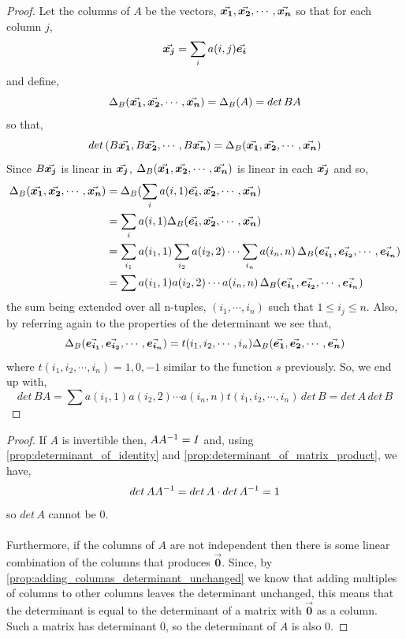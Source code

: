 \documentclass[MathsNotesBase.tex]{subfiles}
\def\0{\vec{\bm{0}}}
\begin{document}
{		
		\begin{proof}
			Let the columns of $A$ be the vectors, $\vec{\bm{x_1}}, \vec{\bm{x_2}}, \cdots , \vec{\bm{x_n}}$ so that for each column $j$,\\
			\[ \vec{\bm{x_j}} = \sum_{i} a(i,j)\vec{\bm{e_i}} \]
			and define,
			\[ \Delta_B(\vec{\bm{x_1}}, \vec{\bm{x_2}}, \cdots , \vec{\bm{x_n}}) = \Delta_B(A) = det\,BA \]
			so that,
			\[ det\,(B\vec{\bm{x_1}}, B\vec{\bm{x_2}}, \cdots , B\vec{\bm{x_n}}) = \Delta_B(\vec{\bm{x_1}}, \vec{\bm{x_2}}, \cdots , \vec{\bm{x_n}}) \] 
			Since $B\vec{\bm{x_j}}$ is linear in $\vec{\bm{x_j}}$, $\Delta_B(\vec{\bm{x_1}}, \vec{\bm{x_2}}, \cdots , \vec{\bm{x_n}})$ is linear in each $\vec{\bm{x_j}}$ and so,
			\begin{align*}
				\Delta_B(\vec{\bm{x_1}}, \vec{\bm{x_2}}, \cdots , \vec{\bm{x_n}}) &= \Delta_B(\sum_{i} a(i,1)\vec{\bm{e_i}}, \vec{\bm{x_2}}, \cdots , \vec{\bm{x_n}})\\
				&= \sum_{i} a(i,1)\Delta_B(\vec{\bm{e_i}}, \vec{\bm{x_2}}, \cdots , \vec{\bm{x_n}})\\
				&= \sum_{i_1} a(i_1,1)\sum_{i_2} a(i_2,2) \cdots \sum_{i_n} a(i_n,n)\,\Delta_B(\vec{\bm{e_{i_1}}}, \vec{\bm{e_{i_2}}}, \cdots , \vec{\bm{e_{i_n}}})\\
				&= \sum a(i_1,1) a(i_2,2) \cdots a(i_n,n)\,\Delta_B(\vec{\bm{e_{i_1}}}, \vec{\bm{e_{i_2}}}, \cdots , \vec{\bm{e_{i_n}}})
			\end{align*}
			the sum being extended over all n-tuples, $(i_1, \cdots , i_n)$ such that \mbox{$1 \leq i_j \leq n$}. Also, by referring again to the properties of the determinant we see that,
			\[ \Delta_B(\vec{\bm{e_{i_1}}}, \vec{\bm{e_{i_2}}}, \cdots , \vec{\bm{e_{i_n}}}) = t(i_1, i_2, \cdots , i_n)\Delta_B(\vec{\bm{e_1}}, \vec{\bm{e_2}}, \cdots , \vec{\bm{e_n}}) \]
			where $t(i_1, i_2, \cdots , i_n) = 1, 0, -1$ similar to the function $s$ previously. So, we end up with,
			\[ det\,BA = \sum a(i_1,1) a(i_2,2) \cdots a(i_n,n) t(i_1, i_2, \cdots , i_n)\,det\,B = det\,A\,det\,B \]
		\end{proof}
	
		\begin{proof}
			If $A$ is invertible then, $A{A}^{-1} = I$ and, using \autoref{prop:determinant_of_identity} and \autoref{prop:determinant_of_matrix_product}, we have,
			\[ det\,A{A}^{-1} = det\,A \cdot det\,{A}^{-1} = 1 \]
			so $det\,A$ cannot be $0$.
			\paragraph{} Furthermore, if the columns of $A$ are not independent then there is some linear combination of the columns that produces $\0$. Since, by \autoref{prop:adding_columns_determinant_unchanged} we know that adding multiples of columns to other columns leaves the determinant unchanged, this means that the determinant is equal to the determinant of a matrix with $\0$ as a column. Such a matrix has determinant 0, so the determinant of $A$ is also 0.
		\end{proof}
	
}
\end{document}
